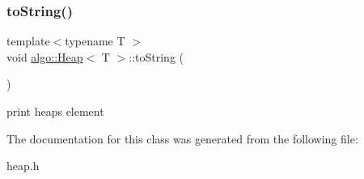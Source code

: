 \subsubsection{\texorpdfstring{to\+String()}{toString()}}
{\footnotesize\ttfamily template$<$typename T $>$ \\
void \hyperlink{classalgo_1_1_heap}{algo\+::\+Heap}$<$ T $>$\+::to\+String (\begin{DoxyParamCaption}{ }\end{DoxyParamCaption})\hspace{0.3cm}{\ttfamily [inline]}}

print heap\textquotesingle{}s element 

The documentation for this class was generated from the following file\+:\begin{DoxyCompactItemize}
\item 
heap.\+h\end{DoxyCompactItemize}
